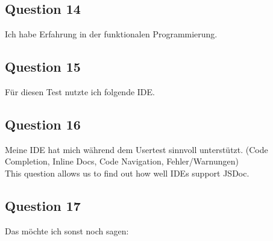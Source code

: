 \subsection{Question 14}
\label{sub:ut_q14}
Ich habe Erfahrung in der funktionalen Programmierung.
\subsection{Question 15}
\label{sub:ut_q15}
Für diesen Test nutzte ich folgende IDE.
\subsection{Question 16}
Meine IDE hat mich während dem Usertest sinnvoll unterstützt. (Code Completion,
Inline Docs, Code Navigation,  Fehler/Warnungen) \\
This question allows us to find out how well IDEs support JSDoc.
\label{sub:ut_q16}
\subsection{Question 17}
\label{sub:ut_q17}
Das möchte ich sonst noch sagen:
